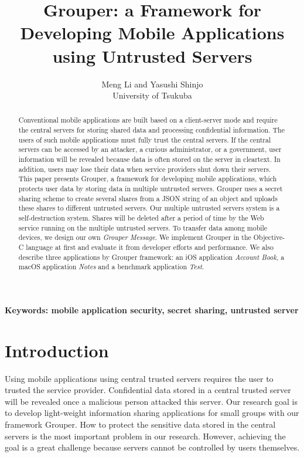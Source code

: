 \documentclass[twocolumn,10pt]{article}
\begin{document}
\title{\bf Grouper: a Framework for Developing Mobile Applications using Untrusted Servers}

\author{
	Meng Li and Yasushi Shinjo \\
	University of Tsukuba
}

\maketitle

\begin{abstract}

Conventional mobile applications are built based on a client-server mode and require the central servers for storing shared data and processing confidential information.
The users of such mobile applications must fully trust the central servers. 
If the central servers can be accessed by an attacker, a curious administrator, or a government, user information will be revealed because data is often stored on the server in cleartext. 
In addition, users may lose their data when service providers shut down their servers.
This paper presents Grouper, a framework for developing mobile applications, which protects user data by storing data in multiple untrusted servers.
Grouper uses a secret sharing scheme to create several shares from a JSON string of an object and uploads these shares to different untrusted servers. 
Our multiple untrusted servers system is a self-destruction system.
Shares will be deleted after a period of time by the Web service running on the multiple untrusted servers.
To transfer data among mobile devices, we design our own \emph{Grouper Message}. 
We implement Grouper in the Objective-C language at first and evaluate it from developer efforts and performance. We also describe three applications by Grouper framework: an iOS application \emph{Account Book}, a macOS application \emph{Notes} and a benchmark application \emph{Test}.

\end{abstract}

\textbf{Keywords: mobile application security, secret sharing, untrusted server}

\section{Introduction}

Using mobile applications using central trusted servers requires the user to trusted the service provider.
Confidential data stored in a central trusted server will be revealed once a malicious person attacked this server.
Our research goal is to develop light-weight information sharing applications for small groups with our framework Grouper. 
How to protect the sensitive data stored in the central servers is the most important problem in our research.
However, achieving the goal is a great challenge because servers cannot be controlled by users themselves.
\end{document}
